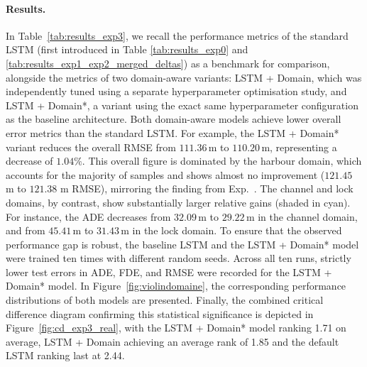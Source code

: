 \paragraph{Results.}

In Table~\ref{tab:results_exp3}, we recall the performance metrics of the standard \ac{LSTM} (first introduced in Table \ref{tab:results_exp0} and \ref{tab:results_exp1_exp2_merged_deltas}) as a benchmark for comparison, alongside the metrics of two domain-aware variants: LSTM + Domain, which was independently tuned using a separate hyperparameter optimisation study, and LSTM + Domain*, a variant using the exact same hyperparameter configuration as the baseline architecture. 
Both domain-aware models achieve lower overall error metrics than the standard \ac{LSTM}. For example, the LSTM + Domain* variant reduces the overall \ac{RMSE} from $111.36$\,m to $110.20$\,m, representing a decrease of $1.04\%$.
This overall figure is dominated by the harbour domain, which accounts for the majority of samples and shows almost no improvement ($121.45$ m to $121.38$ m \ac{RMSE}), mirroring the finding from Exp.~. The channel and lock domains, by contrast, show substantially larger relative gains (shaded in cyan). For instance, the \ac{ADE} decreases from $32.09$\,m to $29.22$\,m in the channel domain, and from $45.41$\,m to $31.43$\,m in the lock domain.
To ensure that the observed performance gap is robust, the baseline \ac{LSTM} and the LSTM + Domain* model were trained ten times with different random seeds. Across all ten runs, strictly lower test errors in \acs{ADE}, \acs{FDE}, and \acs{RMSE} were recorded for the LSTM + Domain* model.
In Figure~\ref{fig:violindomaine}, the corresponding performance distributions of both models are presented.
Finally, the combined critical difference diagram confirming this statistical significance is depicted in Figure~\ref{fig:cd_exp3_real}, with the \ac{LSTM} + Domain* model ranking 1.71 on average, \ac{LSTM} + Domain achieving an average rank of 1.85 and the default \ac{LSTM} ranking last at 2.44.



